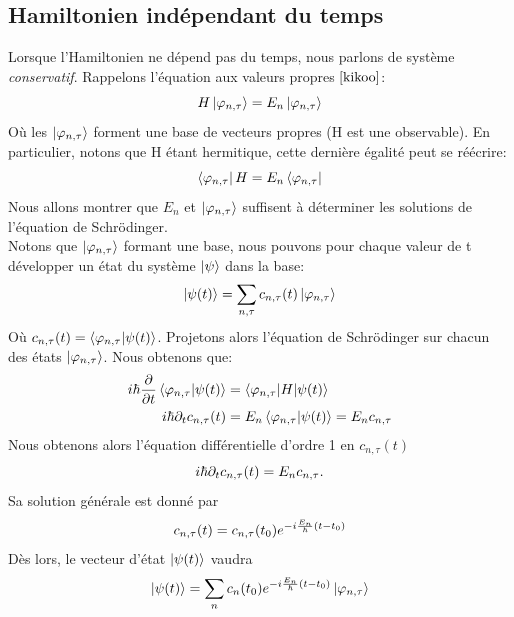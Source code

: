 \documentclass[../notesdecours.tex]{subfiles}
\begin{document}
\subsection{Hamiltonien indépendant du temps}
Lorsque l'Hamiltonien ne dépend pas du temps, nous parlons de système \emph{conservatif}. Rappelons l'équation aux valeurs propres $\eqref{kikoo}$:
\begin{equation*}
H\ket{\varphi_{n,\tau}} = E_n \ket{\varphi_{n,\tau}}
\end{equation*}
Où les $\ket{\varphi_{n,\tau}}$ forment une base de vecteurs propres (H est une observable). En particulier, notons que H étant hermitique, cette dernière égalité peut se réécrire:
\begin{equation}
\bra{\varphi_{n,\tau}}H = E_n \bra{\varphi_{n,\tau}}
\end{equation}
Nous allons montrer que $E_n$ et $\ket{\varphi_{n,\tau}}$ suffisent à déterminer les solutions de l'équation de Schrödinger.\\

Notons que $\ket{\varphi_{n,\tau}}$ formant une base, nous pouvons pour chaque valeur de t développer un état du système $\ket{\psi}$ dans la base:
\begin{equation}
\ket{\psi (t)} = \sum_{n,\tau} c_{n,\tau} (t)\ket{\varphi_{n,\tau}}
\end{equation}
Où $c_{n,\tau}(t) = \braket{\varphi_{n,\tau}|\psi (t)}$. Projetons alors l'équation de Schrödinger sur chacun des états $\ket{\varphi_{n,\tau}}$. Nous obtenons que:
\begin{align*}
i\hbar\frac{\partial}{\partial t}\braket{\varphi_{n,\tau}|\psi (t)} &= \braket{\varphi_{n,\tau} | H | \psi (t)}\\
i\hbar\partial_tc_{n,\tau}(t) &= E_n \braket{\varphi_{n,\tau}|\psi(t)} = E_nc_{n,\tau}
\end{align*}
Nous obtenons alors l'équation différentielle d'ordre 1 en $c_{n,\tau} (t)$
\begin{equation}
i\hbar\partial_tc_{n,\tau}(t) = E_nc_{n,\tau}.
\end{equation}
Sa solution générale est donné par 
\begin{equation}
c_{n,\tau} (t) = c_{n,\tau} (t_0) e^{-i \frac{E_n}{\hbar} (t-t_0)}
\end{equation}
Dès lors, le vecteur d'état $\ket{\psi(t)}$ vaudra
\begin{equation}
\ket{\psi(t)} = \sum_n c_n(t_0)e^{-i\frac{E_n}{\hbar}(t-t_0)} \ket{\varphi_{n,\tau}}
\end{equation}
\end{document}
